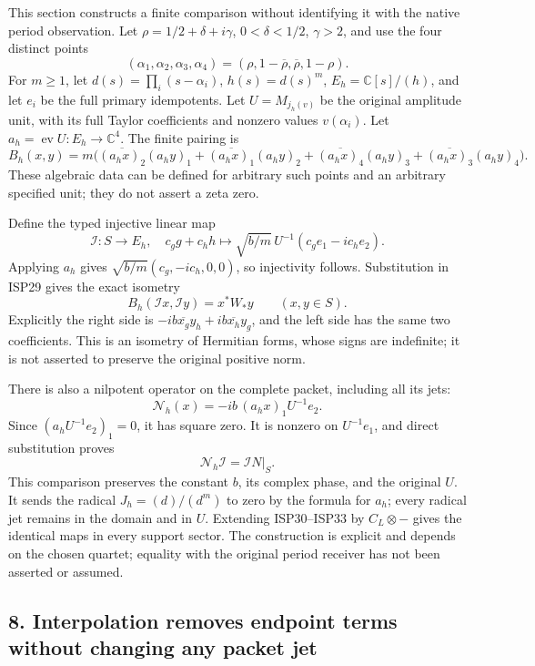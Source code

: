 \documentclass[
  10pt,
  a4paper,
]{article}
\begin{document}
This section constructs a finite comparison without identifying it with
the native period observation. Let \(\rho=1/2+\delta+i\gamma\),
\(0<\delta<1/2\), \(\gamma>2\), and use the four distinct points \[
(\alpha_1,\alpha_2,\alpha_3,\alpha_4)
=(\rho,1-\overline\rho,\overline\rho,1-\rho).
\] For \(m\ge1\), let \(d(s)=\prod_i(s-\alpha_i)\), \(h(s)=d(s)^m\),
\(E_h=\mathbb C[s]/(h)\), and let \(e_i\) be the full primary
idempotents. Let \(U=M_{j_h(v)}\) be the original amplitude unit, with
its full Taylor coefficients and nonzero values \(v(\alpha_i)\). Let
\(a_h=\operatorname{ev}U:E_h\to\mathbb C^4\). The finite pairing is \[
B_h(x,y)=m\bigl(\overline{(a_hx)_2}(a_hy)_1+
\overline{(a_hx)_1}(a_hy)_2+
\overline{(a_hx)_4}(a_hy)_3+
\overline{(a_hx)_3}(a_hy)_4\bigr).
\tag{ISP29}
\] These algebraic data can be defined for arbitrary such points and an
arbitrary specified unit; they do not assert a zeta zero.

Define the typed injective linear map \[
\mathcal I:S\longrightarrow E_h,
\quad c_gg+c_hh\longmapsto
\sqrt{b/m}\,U^{-1}(c_ge_1-ic_he_2).
\tag{ISP30}
\] Applying \(a_h\) gives \(\sqrt{b/m}(c_g,-ic_h,0,0)\), so injectivity
follows. Substitution in ISP29 gives the exact isometry \[
B_h(\mathcal I x,\mathcal I y)=x^*W_*y\qquad(x,y\in S).
\tag{ISP31}
\] Explicitly the right side is
\(-ib\overline{x_g}y_h+ib\overline{x_h}y_g\), and the left side has the
same two coefficients. This is an isometry of Hermitian forms, whose
signs are indefinite; it is not asserted to preserve the original
positive norm.

There is also a nilpotent operator on the complete packet, including all
its jets: \[
\mathcal N_h(x)=-ib\,(a_hx)_1 U^{-1}e_2.
\tag{ISP32}
\] Since \((a_hU^{-1}e_2)_1=0\), it has square zero. It is nonzero on
\(U^{-1}e_1\), and direct substitution proves \[
\mathcal N_h\mathcal I=\mathcal I N|_S.
\tag{ISP33}
\] This comparison preserves the constant \(b\), its complex phase, and
the original \(U\). It sends the radical \(J_h=(d)/(d^m)\) to zero by
the formula for \(a_h\); every radical jet remains in the domain and in
\(U\). Extending ISP30--ISP33 by \(C_L\otimes-\) gives the identical
maps in every support sector. The construction is explicit and depends
on the chosen quartet; equality with the original period receiver has
not been asserted or assumed.

\subsection{8. Interpolation removes endpoint terms without changing any
packet
jet}\label{interpolation-removes-endpoint-terms-without-changing-any-packet-jet}
\end{document}
